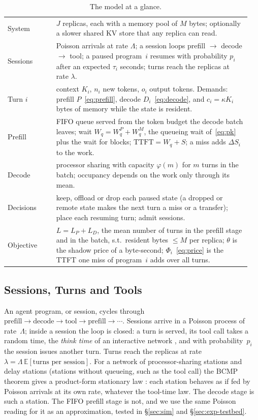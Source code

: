 \documentclass{article}
\theoremstyle{plain}
\theoremstyle{definition}
\theoremstyle{remark}
\newcommand{\E}{\mathbb{E}}
\begin{document}
\begin{table}[t]
\caption{The model at a glance.}\label{tab:model}
\centering\small
\begin{tabular}{@{}>{\raggedright\arraybackslash}p{0.19\linewidth}>{\raggedright\arraybackslash}p{0.76\linewidth}@{}}
\toprule
System & $J$ replicas, each with a memory pool of $M$ bytes; optionally
  a slower shared KV store that any replica can read. \\
Sessions & Poisson arrivals at rate $\Lambda$; a session loops
  prefill $\to$ decode $\to$ tool; a paused program~$i$ resumes with
  probability $p_i$ after an expected $\tau_i$ seconds; turns reach the
  replicas at rate $\lambda$. \\
Turn $i$ & context $K_i$, $n_i$ new tokens, $o_i$ output tokens.
  Demands: prefill $P$~\eqref{eq:prefill}, decode $D_i$~\eqref{eq:decode},
  and $c_i=\kappa K_i$ bytes of memory while the state is resident. \\
Prefill & FIFO queue served from the token budget the decode batch
  leaves; wait $W_q=W_q^P+W_q^M$, the queueing wait of~\eqref{eq:pk}
  plus the wait for blocks; $\mathrm{TTFT}=W_q+S$; a miss adds
  $\Delta S_i$ to the work. \\
Decode & processor sharing with capacity $\varphi(m)$ for $m$ turns in
  the batch; occupancy depends on the work only through its mean. \\
Decisions & keep, offload or drop each paused state (a dropped or
  remote state makes the next turn a miss or a transfer); place each
  resuming turn; admit sessions. \\
Objective & $L=L_P+L_D$, the mean number of turns in the prefill stage
  and in the batch, s.t.\ resident bytes $\le M$ per replica; $\theta$
  is the shadow price of a byte-second; $\Phi_i$~\eqref{eq:price} is
  the TTFT one miss of program~$i$ adds over all turns. \\
\bottomrule
\end{tabular}
\end{table}

\subsection{Sessions, Turns and Tools}\label{sec:sessions}\label{sec:closed}

An agent program, or session, cycles through
$\text{prefill}\to\text{decode}\to\text{tool}\to\text{prefill}\to\cdots$.
Sessions arrive in a Poisson process of rate~$\Lambda$; inside a
session the loop is closed: a turn is served, its tool call takes a
random time, the \emph{think time} of an interactive network
\citep{lazowska1984}, and with probability~$p_i$ the session issues
another turn. Turns reach the replicas at rate
$\lambda=\Lambda\,\E[\text{turns per session}]$. For a network of processor-sharing stations and delay stations
(stations without queueing, such as the tool call) the BCMP theorem
gives a product-form stationary law \citep{bcmp1975}: each station
behaves as if fed by Poisson arrivals at its own rate, whatever the
tool-time law. The decode stage is such a station. The FIFO prefill
stage is not, and we use the same Poisson reading for it as an
approximation, tested in \S\ref{sec:sim} and \S\ref{sec:exp-testbed}.
\end{document}
